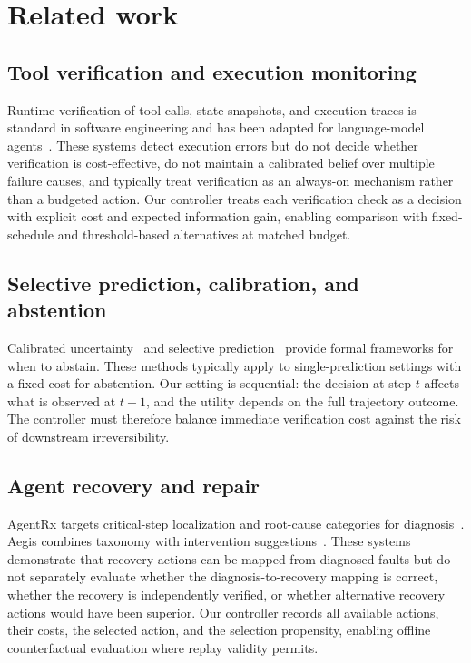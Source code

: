 \section{Related work}
\label{sec:related_work}

\subsection{Tool verification and execution monitoring}

Runtime verification of tool calls, state snapshots, and execution traces
is standard in software engineering and has been adapted for language-model
agents~\citep{shinn2024,yao2023}. These systems detect execution errors but
do not decide whether verification is cost-effective, do not maintain a
calibrated belief over multiple failure causes, and typically treat
verification as an always-on mechanism rather than a budgeted action. Our
controller treats each verification check as a decision with explicit cost
and expected information gain, enabling comparison with fixed-schedule and
threshold-based alternatives at matched budget.

\subsection{Selective prediction, calibration, and abstention}

Calibrated uncertainty~\citep{guo2017} and selective
prediction~\citep{geifman2017} provide formal frameworks for when to abstain.
These methods typically apply to single-prediction settings with a fixed
cost for abstention. Our setting is sequential: the decision at step $t$
affects what is observed at $t+1$, and the utility depends on the full
trajectory outcome. The controller must therefore balance immediate
verification cost against the risk of downstream irreversibility.

\subsection{Agent recovery and repair}

AgentRx targets critical-step localization and root-cause categories for
diagnosis~\citep{agentrx2026}. Aegis combines taxonomy with intervention
suggestions~\citep{aegis2025}. These systems demonstrate that recovery
actions can be mapped from diagnosed faults but do not separately evaluate
whether the diagnosis-to-recovery mapping is correct, whether the recovery
is independently verified, or whether alternative recovery actions would
have been superior. Our controller records all available actions, their
costs, the selected action, and the selection propensity, enabling offline
counterfactual evaluation where replay validity permits.

